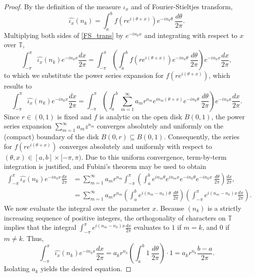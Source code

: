 \documentclass[11pt,a4paper]{article}
\newcommand{\T}{\mathbb{T}}
\def\sub{\subseteq}
\def\sub{\subseteq}
\begin{document}
\begin{proof}
By the definition of the measure $\iota_x$ and of Fourier-Stieltjes transform,
\begin{equation}
\widehat{\iota_x}(n_k) = \int_{a}^{b} f(re^{i(\theta+x)})e^{-in_k\theta}\ \frac{d\theta}{2\pi}.\label{FS_trans}
\end{equation}
Multiplying both sides of \eqref{FS_trans} by $e^{-in_k x}$ and integrating with respect to $x$ over $\T$,
\[
\int_{-\pi}^\pi \widehat{\iota_x}(n_k) e^{-in_k x} \frac{dx}{2\pi} = \int_{-\pi}^\pi \left( \int_{a}^{b} f(re^{i(\theta+x)}) e^{-in_k\theta} \ \frac{d\theta}{2\pi} \right) e^{-in_k x} \frac{dx}{2\pi},
\]
 to which we substitute the power series expansion for $f(re^{i(\theta+x)})$, which results to
\[
\int_{-\pi}^\pi \widehat{\iota_x}(n_k) e^{-in_k x} \frac{dx}{2\pi} = \int_{-\pi}^\pi \left( \int_{a}^{b} \sum_{m=1}^\infty a_m r^{n_m} e^{in_m(\theta+x)} e^{-in_k\theta} \ \frac{d\theta}{2\pi} \right) e^{-in_k x} \frac{dx}{2\pi}.
\]
Since $r \in (0,1)$ is fixed and $f$ is analytic on the open disk $B(0,1)$, the power series expansion $\sum_{m=1}^\infty a_m z^{n_m}$ converges absolutely and uniformly on the (compact) boundary of the disk $B(0,r)\sub B(0,1)$. Consequently, the series for $f(re^{i(\theta+x)})$ converges absolutely and uniformly with respect to $(\theta, x) \in [a,b] \times [-\pi, \pi)$. Due to this uniform convergence, term-by-term integration is justified, and Fubini's theorem may be used to obtain
\begin{align*}
\int_{-\pi}^\pi \widehat{\iota_x}(n_k) e^{-in_k x} \frac{dx}{2\pi} &= \sum_{m=1}^\infty a_m r^{n_m} \int_{-\pi}^\pi \left( \int_{a}^{b} e^{in_m\theta} e^{in_mx} e^{-in_k\theta} e^{-in_k x} \ \frac{d\theta}{2\pi} \right) \frac{dx}{2\pi}, \\
&= \sum_{m=1}^\infty a_m r^{n_m} \left( \int_{a}^{b} e^{i(n_m - n_k)\theta}\ \frac{d\theta}{2\pi} \right) \left( \int_{-\pi}^\pi e^{i(n_m - n_k)x} \frac{dx}{2\pi} \right).
\end{align*}
We now evaluate the integral over the parameter $x$. Because $(n_k)$ is a strictly increasing sequence of positive integers, the orthogonality of characters on $\T$ implies that the integral $\int_{-\pi}^\pi e^{i(n_m - n_k)x} \frac{dx}{2\pi}$ evaluates to $1$ if $m = k$, and $0$ if $m \neq k$. Thus, 
\[
\int_{-\pi}^\pi \widehat{\iota_x}(n_k) e^{-in_k x} \frac{dx}{2\pi} = a_k r^{n_k} \left( \int_{a}^{b} 1\ \frac{d\theta}{2\pi} \right) \cdot 1 = a_k r^{n_k} \frac{b-a}{2\pi}.
\]
Isolating $a_k$ yields the desired equation.
\end{proof}
\end{document}
